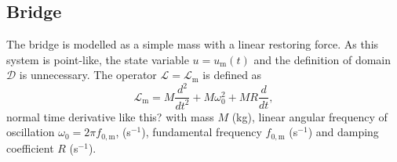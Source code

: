 \documentclass[dvipsnames, pdftex]{article}
\def\SWcomment[#1]{\textcolor{Bittersweet}{#1}}
\begin{document}
\subsection{Bridge}
The bridge is modelled as a simple mass with a linear restoring force. As this system is point-like, %
the state variable $u = u_\text{m}(t)$ and the definition of domain $\mathcal{D}$ is unnecessary. The operator $\mathcal{L}=\mathcal{L}_\text{m}$ is defined as
\begin{equation}
    \mathcal{L}_\text{m}=M\frac{d^2}{dt^2}+M\omega_0^2+MR\frac{d}{dt},
\end{equation}
\SWcomment[normal time derivative like this?] with mass $M$ (kg), linear angular frequency of oscillation $\omega_0=2\pi f_{0,\text{m}}$,  (s$^{-1}$), fundamental frequency $f_{0,\text{m}}$ (s$^{-1}$) and damping coefficient $R$ (s$^{-1}$).
\end{document}

